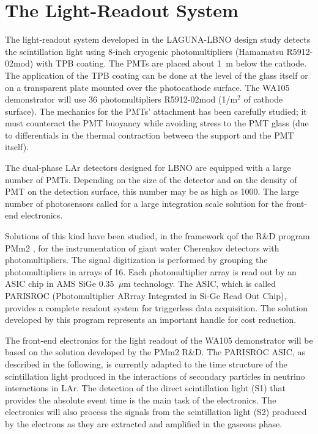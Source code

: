 \section{The Light-Readout System} 
\label{sec:detectors-fd-alt-light}

The light-readout system developed in the LAGUNA-LBNO design study
detects the scintillation light using 8-inch cryogenic
photomultipliers (Hamamatsu R5912-02mod) with TPB coating. The PMTs
are placed about 1~m below the cathode.  The application of the TPB
coating can be done at the level of the glass itself or on a
transparent plate mounted over the photocathode surface. The WA105
demonstrator will use 36 photomultipliers R5912-02mod (1/m$^2$ of
cathode surface). The mechanics for the PMTs' attachment has been
carefully studied; it must counteract the PMT buoyancy while avoiding
stress to the PMT glass (due to differentials in the thermal
contraction between the support and the PMT itself).

The dual-phase LAr detectors designed for LBNO are equipped with a
large number of PMTs. Depending on the size of the detector and on the
density of PMT on the detection surface, this number may be as high as
1000. The large number of photosensors called for a large integration
scale solution for the front-end electronics.

Solutions of this kind have been studied, in the framework qof the
R\&D program PMm2 \cite{PMM2-1, PMM2-2}, for the instrumentation of
giant water Cherenkov detectors with photomultipliers. The signal
digitization is performed by grouping the photomultipliers in arrays
of 16. Each photomultiplier array is read out by an ASIC chip in AMS
SiGe 0.35~$\mu$m technology. The ASIC, which is called PARISROC
(Photomultiplier ARrray Integrated in Si-Ge Read Out
Chip)\cite{Parisroc}, provides a complete readout system for
triggerless data acquisition. The solution developed by this program
represents an important handle for cost reduction.



The front-end electronics for the light readout of the WA105
demonstrator will be based on the solution developed by the PMm2
R\&D. The PARISROC ASIC, as described in the following, is currently
adapted to the time structure of the scintillation light produced in
the interactions of secondary particles in neutrino interactions in
LAr. The detection of the direct scintillation light (S1) that
provides the absolute event time is the main task of the electronics.
The electronics will also process the signals from the scintillation
light (S2) produced by the electrons as they are extracted and
amplified in the gaseous phase.


